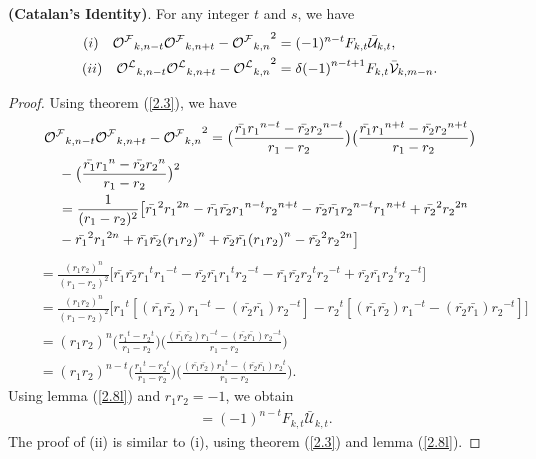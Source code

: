 \begin{theorem}\textbf{(Catalan's Identity)}. For any integer $t$ and $s$, we have \label{2.9t}
\begin{align*}
(i)\quad{{\mathcal{O^F}}}_{k,n-t}{{\mathcal{O^F}}}_{k,n+t}-{{{\mathcal{O^F}}}_{k,n}}^2&=(-1)^{n-t}F_{k,t}\bar{\mathcal{U}}_{k,t},\\
(ii)\quad{{\mathcal{O^L}}}_{k,n-t}{{\mathcal{O^L}}}_{k,n+t}-{{{\mathcal{O^L}}}_{k,n}}^2&=\delta{(-1)}^{n-t+1}{{F}_{k,t}}\bar{\mathcal{V}}_{k,m-n}.
\end{align*}
\end{theorem}
\begin{proof}
Using theorem (\ref{2.3}), we have
\begin{align*}
&{{\mathcal{O^F}}}_{k,n-t}{{\mathcal{O^F}}}_{k,n+t}-{{{\mathcal{O^F}}}_{k,n}}^2=\big(\frac{\bar{r_1}{{r_1}}^{n-t}-\bar{r_2}{r_{2}}^{n-t}}{r_1-r_2}\big)\big(\frac{\bar{r_1}{{r_1}}^{n+t}-\bar{r_2}{r_{2}}^{n+t}}{r_1-r_2}\big)\\&\quad -\big(\frac{\bar{r_1}{{r_1}}^{n}-\bar{r_2}{r_{2}}^{n}}{r_1-r_2}\big)^2\\
&\quad =\frac{1}{(r_1-r_2)^2}\big[{\bar{r_1}}^2{r_1}^{2n}-{\bar{r_1}\bar{r_2}}{r_1}^{n-t}{r_2}^{n+t}-{\bar{r_2}\bar{r_1}}{r_2}^{n-t}{r_1}^{n+t}+{\bar{r_2}}^2{r_2}^{2n}\\&\quad -{\bar{r_1}}^2{r_1}^{2n}+{\bar{r_1}\bar{r_2}}{(r_1r_2)}^{n}+{\bar{r_2}\bar{r_1}}{(r_1r_2)}^{n}-{\bar{r_2}}^2{r_2}^{2n}\big]\\
\end{align*}
\begin{align*}
&\quad =\frac{(r_1r_2)^n}{(r_1-r_2)^2}\big[{\bar{r_1}\bar{r_2}}{r_1}^{t}{r_1}^{-t}-{\bar{r_2}\bar{r_1}}{r_1}^{t}{r_2}^{-t}-{\bar{r_1}\bar{r_2}}{r_2}^{t}{r_2}^{-t}+{\bar{r_2}\bar{r_1}}{r_2}^{t}{r_2}^{-t}\big]\\
&\quad =\frac{(r_1r_2)^n}{(r_1-r_2)^2}\big[{r_1}^t[(\bar{r_1}\bar{r_2}){r_1}^{-t}-(\bar{r_2}\bar{r_1}){r_2}^{-t}]-{r_2}^t[(\bar{r_1}\bar{r_2}){r_1}^{-t}-(\bar{r_2}\bar{r_1}){r_2}^{-t}]\big]\\
&\quad =(r_1r_2)^{n}\big(\frac{{r_1}^t-{r_2}^t}{r_1-r_2}\big)\big(\frac{(\bar{r_1}\bar{r_2}){r_1}^{-t}-(\bar{r_2}\bar{r_1}){r_2}^{-t}}{r_1-r_2}\big)\\
&\quad =(r_1r_2)^{n-t}\big(\frac{{r_1}^t-{r_2}^t}{r_1-r_2}\big)\big(\frac{(\bar{r_1}\bar{r_2}){r_1}^{t}-(\bar{r_2}\bar{r_1}){r_2}^{t}}{r_1-r_2}\big).
\end{align*}
Using lemma (\ref{2.8l}) and $r_1r_2=-1$, we obtain
\begin{align*}
&=(-1)^{n-t}F_{k,t}\bar{\mathcal{U}}_{k,t}.
\end{align*}
The proof of (ii) is similar to (i), using theorem (\ref{2.3}) and lemma (\ref{2.8l}).
\end{proof}

